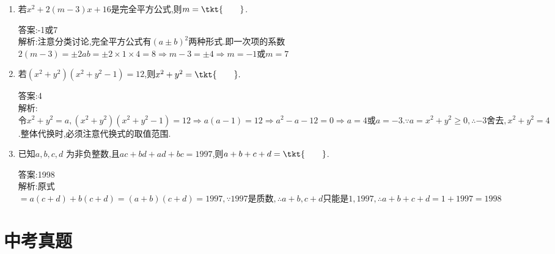 \documentclass[cn,blue]{elegantbook}
\begin{document}
\begin{enumerate}
    \item 若\(x^2 + 2(m - 3)x +16\)是完全平方公式,则\(m=\tkt{\qquad}\).
\begin{solution}
    答案:-1或7\\
    解析:注意分类讨论,完全平方公式有\((a\pm b)^2\)两种形式.即一次项的系数\(2(m-3)=\pm 2ab=\pm 2\times 1\times 4=8 \Rightarrow m-3=\pm 4 \Rightarrow m=-1\text{或}m=7\)\\
\end{solution}
    \item 若\((x^2 + y^2 )(x^2 + y^2 -1) =12\),则\(x^2 + y^2 =\tkt{\qquad}.\)
\begin{solution}
    答案:4\\
    解析:\(\text{令}x^2+y^2=a,(x^2 +y^2)(x^2+y^2-1)=12\Rightarrow a(a-1)=12 \Rightarrow a^2-a-12=0 \Rightarrow a=4\text{或}a=-3. \because a=x^2+y^2\ge 0,\therefore -3\text{舍去},x^2+y^2=4\).整体代换时,必须注意代换式的取值范围.\\
\end{solution}
    \item 已知\(a,b,c,d\) 为非负整数,且\(ac + bd + ad + bc =1997\),则\(a + b + c + d = \tkt{\qquad}\).
\begin{solution}
    答案:1998\\
    解析:原式\(=a(c+d)+b(c+d)=(a+b)(c+d)=1997,\because 1997\text{是质数},\therefore a+b,c+d\text{只能是}1,1997,\therefore a+b+c+d=1+1997=1998\)\\
\end{solution}
\end{enumerate}

\section{中考真题}%
\end{document}

